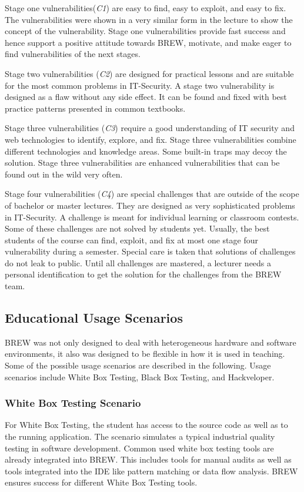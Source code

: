 \documentclass{llncs}
\begin{document}
Stage one vulnerabilities({\em C1}) are easy to find, easy to exploit, and easy to fix. The vulnerabilities were shown in a very similar form in the lecture to show the concept of the vulnerability. Stage one vulnerabilities provide fast success and hence support a positive attitude towards BREW, motivate, and make eager to find vulnerabilities of the next stages.

Stage two vulnerabilities ({\em C2}) are designed for practical lessons and are suitable for the most common problems in IT-Security.
A stage two vulnerability is designed as a flaw without any side effect.
It can be found and fixed with best practice patterns presented in common textbooks.

Stage three vulnerabilities ({\em C3}) require a good understanding of IT security and web technologies to identify, explore, and fix. Stage three vulnerabilities combine different technologies and knowledge areas. Some built-in traps may decoy the solution. Stage three vulnerabilities are enhanced vulnerabilities that can be found out in the wild very often.

Stage four vulnerabilities ({\em C4}) are special challenges that are outside of the scope of bachelor or master lectures. They are designed as very sophisticated problems in IT-Security. A challenge is meant for individual learning or classroom contests. Some of these challenges are not solved by students yet. Usually, the best students of the course can find, exploit, and fix  at most one stage four vulnerability during a semester. Special care is taken that solutions of challenges do not leak to public. Until all challenges are mastered, a lecturer needs a personal identification to get the solution for the challenges from the BREW team.


\subsection{Educational Usage Scenarios}\label{subsec:usage}
BREW was not only designed to deal with heterogeneous hardware and software environments, it also was designed to be flexible in how it is used in teaching. Some of the possible usage scenarios are described in the following. Usage scenarios include White Box Testing, Black Box Testing, and  Hackveloper.

\subsubsection{White Box Testing Scenario} 
For White Box Testing, the student has access to the source code as well as to the running application. The scenario simulates a typical industrial quality testing in software development. Common used white box testing tools are already integrated into BREW. This includes tools for manual audits as well as tools integrated into the IDE like pattern matching or data flow analysis. BREW ensures success for different White Box Testing tools.
\end{document}
